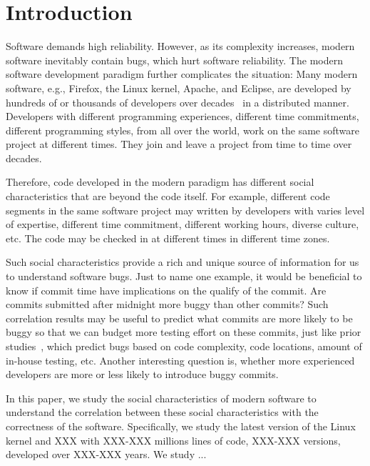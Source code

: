 \section{Introduction}

Software demands high reliability. However, as its complexity increases, 
modern software inevitably contain bugs, which hurt software reliability.
The modern software development paradigm further complicates the situation: 
Many modern software, e.g., Firefox, the Linux kernel, Apache, and Eclipse, 
are developed by hundreds of or thousands of developers over decades~\cite{ccomment} 
in a distributed manner. Developers with different programming experiences, 
different time commitments, different programming styles, from all over the world,
work on the same software project at different times. They join and leave a project 
from time to time over decades. 

Therefore, code developed in the modern paradigm has different social characteristics 
that are beyond the code itself. For example, different code segments in the same
software project may written by developers with  
varies level of expertise, different time 
commitment, different working hours, diverse culture, etc.
The code may be checked in at different times in different time zones. 

Such social characteristics provide a rich and unique source of information for us to 
understand software bugs. Just to name one example, it would be beneficial to know if  
commit time have implications on the qualify of the commit. 
Are commits submitted after midnight more buggy than other commits? 
Such correlation results may be useful to predict what commits are more likely
to be buggy so that we can budget more testing effort on these commits, just
like prior studies~\cite{graves00predicting, guo04robust, ostrand05predicting},
which predict bugs based on code complexity, 
code locations, amount of in-house testing, etc. 
Another interesting question is, whether more experienced developers are more or less
likely to introduce buggy commits. 

In this paper, we study the social characteristics of modern software to understand 
the correlation between these social characteristics with the correctness of the software.  
Specifically, we study the latest version of the Linux kernel and XXX with XXX-XXX millions lines 
of code, XXX-XXX versions, developed over XXX-XXX years. We study ...

